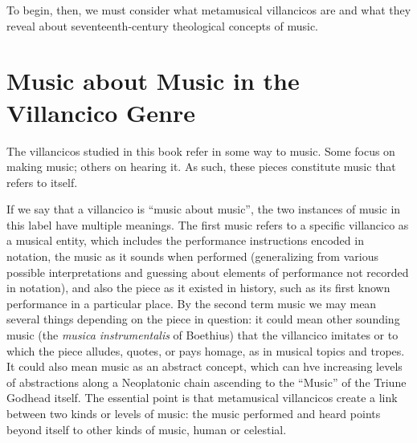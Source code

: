 \documentclass[oneside,12pt]{book}
\begin{document}
      To begin, then, we must consider what metamusical villancicos are and what they reveal about seventeenth-century theological concepts of music.
    
\section{Music about Music in the Villancico Genre}
\label{ch1:music-about-music}

      The villancicos studied in this book refer in some way to music.
      Some focus on making music; others on hearing it.
      As such, these pieces constitute music that refers to itself.
    
      If we say that a villancico is \enquote{music about music}, the two instances of music in this label have multiple meanings.
      The first music refers to a specific villancico as a musical entity, which includes the performance instructions encoded in notation, the music as it sounds when performed (generalizing from various possible interpretations and guessing about elements of performance not recorded in notation), and also the piece as it existed in history, such as its first known performance in a particular place.
      By the second term music we may mean several things depending on the piece in question: it could mean other sounding music (the \emph{musica instrumentalis} of Boethius) that the villancico imitates or to which the piece alludes, quotes, or pays homage, as in musical topics and tropes.
      It could also mean music as an abstract concept, which can hve increasing levels of abstractions along a Neoplatonic chain ascending to the \enquote{Music} of the Triune Godhead itself.
      The essential point is that metamusical villancicos create a link between two kinds or levels of music: the music performed and heard points beyond itself to other kinds of music, human or celestial.
    
\end{document}
